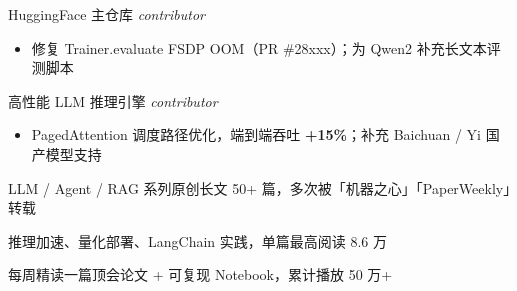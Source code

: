 {HuggingFace 主仓库 \textbullet{} \textit{contributor}}{%
\begin{itemize}
  \item 修复 Trainer.evaluate FSDP OOM（PR \#28xxx）；为 Qwen2 补充长文本评测脚本
\end{itemize}
}

{高性能 LLM 推理引擎 \textbullet{} \textit{contributor}}{%
\begin{itemize}
  \item PagedAttention 调度路径优化，端到端吞吐 \textbf{+15\%}；补充 Baichuan / Yi 国产模型支持
\end{itemize}
}


{LLM / Agent / RAG 系列原创长文 50+ 篇，多次被「机器之心」「PaperWeekly」转载}

{推理加速、量化部署、LangChain 实践，单篇最高阅读 8.6 万}

{每周精读一篇顶会论文 + 可复现 Notebook，累计播放 50 万+}

